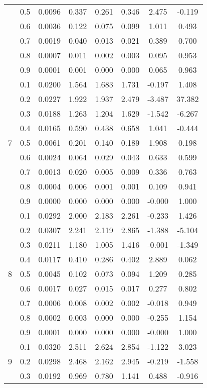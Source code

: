 \documentclass[11pt,a4paper]{report}
\begin{document}
\begin{longtable}{ | c | c || c | c | c | c | c | c | }
 & 0.5 & 0.0096 & 0.337 & 0.261 & 0.346 & 2.475 & -0.119 \\
 & 0.6 & 0.0036 & 0.122 & 0.075 & 0.099 & 1.011 & 0.493 \\
 & 0.7 & 0.0019 & 0.040 & 0.013 & 0.021 & 0.389 & 0.700 \\
 & 0.8 & 0.0007 & 0.011 & 0.002 & 0.003 & 0.095 & 0.953 \\
 & 0.9 & 0.0001 & 0.001 & 0.000 & 0.000 & 0.065 & 0.963 \\
 \hline
\multirow{9}{*}{7} & 0.1 & 0.0200 & 1.564 & 1.683 & 1.731 & -0.197 & 1.408 \\
 & 0.2 & 0.0227 & 1.922 & 1.937 & 2.479 & -3.487 & 37.382 \\
 & 0.3 & 0.0188 & 1.263 & 1.204 & 1.629 & -1.542 & -6.267 \\
 & 0.4 & 0.0165 & 0.590 & 0.438 & 0.658 & 1.041 & -0.444 \\
 & 0.5 & 0.0061 & 0.201 & 0.140 & 0.189 & 1.908 & 0.198 \\
 & 0.6 & 0.0024 & 0.064 & 0.029 & 0.043 & 0.633 & 0.599 \\
 & 0.7 & 0.0013 & 0.020 & 0.005 & 0.009 & 0.336 & 0.763 \\
 & 0.8 & 0.0004 & 0.006 & 0.001 & 0.001 & 0.109 & 0.941 \\
 & 0.9 & 0.0000 & 0.000 & 0.000 & 0.000 & -0.000 & 1.000 \\
 \hline
\multirow{9}{*}{8} & 0.1 & 0.0292 & 2.000 & 2.183 & 2.261 & -0.233 & 1.426 \\
 & 0.2 & 0.0307 & 2.241 & 2.119 & 2.865 & -1.388 & -5.104 \\
 & 0.3 & 0.0211 & 1.180 & 1.005 & 1.416 & -0.001 & -1.349 \\
 & 0.4 & 0.0117 & 0.410 & 0.286 & 0.402 & 2.889 & 0.062 \\
 & 0.5 & 0.0045 & 0.102 & 0.073 & 0.094 & 1.209 & 0.285 \\
 & 0.6 & 0.0017 & 0.027 & 0.015 & 0.017 & 0.277 & 0.802 \\
 & 0.7 & 0.0006 & 0.008 & 0.002 & 0.002 & -0.018 & 0.949 \\
 & 0.8 & 0.0002 & 0.003 & 0.000 & 0.000 & -0.255 & 1.154 \\
 & 0.9 & 0.0001 & 0.000 & 0.000 & 0.000 & -0.000 & 1.000 \\
 \hline
\multirow{9}{*}{9} & 0.1 & 0.0320 & 2.511 & 2.624 & 2.854 & -1.122 & 3.023 \\
 & 0.2 & 0.0298 & 2.468 & 2.162 & 2.945 & -0.219 & -1.558 \\
 & 0.3 & 0.0192 & 0.969 & 0.780 & 1.141 & 0.488 & -0.916 \\

\end{longtable}
\end{document}
